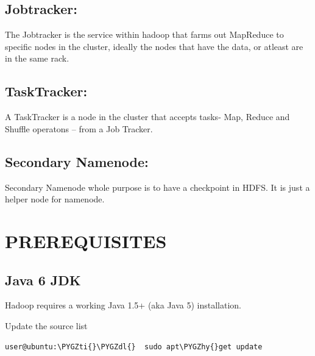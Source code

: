 \documentclass[a4paper,12pt,oneside]{sphinxmanual}
\def\PYGZdl{\char`\$}
\def\PYGZhy{\char`\-}
\def\PYGZti{\char`\~}
\begin{document}
\subsection{Jobtracker:}
\label{document:jobtracker}
The Jobtracker is the service within hadoop that farms out MapReduce to specific nodes in the cluster, ideally the nodes that have the data, or atleast are in the same rack.


\subsection{TaskTracker:}
\label{document:tasktracker}
A TaskTracker is a node in the cluster that accepts tasks- Map, Reduce and Shuffle operatons – from a Job Tracker.


\subsection{Secondary Namenode:}
\label{document:secondary-namenode}
Secondary Namenode whole purpose is to have a checkpoint in HDFS. It is just a helper node for namenode.


\section{PREREQUISITES}
\label{document:prerequisites}

\subsection{Java 6 JDK}
\label{document:java-6-jdk}
Hadoop requires a working Java 1.5+ (aka Java 5) installation.

Update the source list

\begin{Verbatim}[commandchars=\\\{\}]
user@ubuntu:\PYGZti{}\PYGZdl{}  sudo apt\PYGZhy{}get update
\end{Verbatim}
\begin{figure}[htbp]
\centering

\end{figure}
\end{document}
